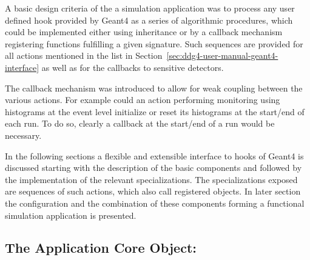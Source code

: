 \documentclass[10pt,a4paper]{article}
\begin{document}
\noindent
A basic design criteria of the a \DDG simulation application was to 
process any user defined hook provided by Geant4 as a series of algorithmic
procedures, which could be implemented either using inheritance or by 
a callback mechanism registering functions fulfilling a given signature.
Such sequences are provided for all actions mentioned in the list in 
Section~\ref{sec:ddg4-user-manual-geant4-interface} as well as for 
the callbacks to sensitive detectors.

\noindent
The callback mechanism was introduced to allow for weak coupling between 
the various actions. For example could an action performing monitoring
using histograms at the event level initialize or reset its histograms
at the start/end of each run. To do so, clearly a callback at the 
start/end of a run would be necessary.

\noindent
In the following sections a flexible and extensible interface to hooks
of Geant4 is discussed starting with the description of the basic
components  and  followed by the 
implementation of the relevant specializations.
The specializations exposed are sequences of such actions,
which also call registered objects.
In later section the configuration and the combination of these components 
forming a functional simulation application is presented.

\subsection{The Application Core Object: }
\label{sec:ddg4-user-manual-implementation-geant4kernel}
\end{document}

